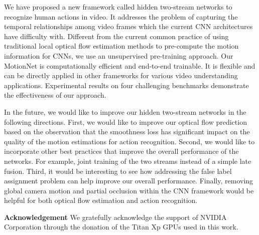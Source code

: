 \documentclass[runningheads]{llncs}
\begin{document}
		We have proposed a new framework called hidden two-stream networks to recognize human actions in video. It addresses the problem of capturing the temporal relationships among video frames which the current CNN architectures have difficulty with. Different from the current common practice of using traditional local optical flow estimation methods to pre-compute the motion information for CNNs, we use an unsupervised pre-training approach. Our MotionNet is computationally efficient and end-to-end trainable. It is flexible and can be directly applied in other frameworks for various video understanding applications. Experimental results on four challenging benchmarks demonstrate the effectiveness of our approach.
		
		In the future, we would like to improve our hidden two-stream networks in the following directions. First, we would like to improve our optical flow prediction based on the observation that the smoothness loss has significant impact on the quality of the motion estimations for action recognition. Second, we would like to incorporate other best practices that improve the overall performance of the networks. For example, joint training of the two streams instead of a simple late fusion. Third, it would be interesting to see how addressing the false label assignment problem can help improve our overall performance. Finally, removing global camera motion and partial occlusion within the CNN framework would be helpful for both optical flow estimation and action recognition. 
	
	\noindent \textbf{Acknowledgement} We gratefully acknowledge the support of NVIDIA Corporation through the donation of the Titan Xp GPUs used in this work.
	
		
	
\end{document}
